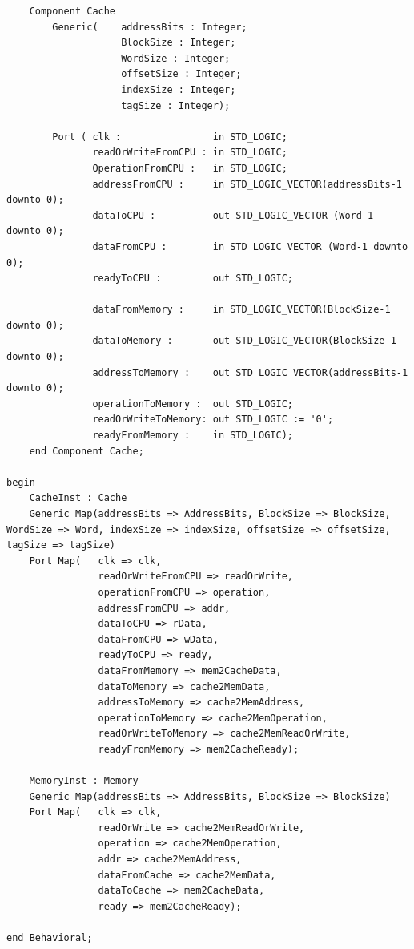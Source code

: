 \documentclass{article}
\begin{document}
\begin{lstlisting}
    Component Cache
        Generic(    addressBits : Integer;
                    BlockSize : Integer;
                    WordSize : Integer;
                    offsetSize : Integer;
                    indexSize : Integer;
                    tagSize : Integer);

        Port ( clk :                in STD_LOGIC;
               readOrWriteFromCPU : in STD_LOGIC;
               OperationFromCPU :   in STD_LOGIC;
               addressFromCPU :     in STD_LOGIC_VECTOR(addressBits-1 downto 0);
               dataToCPU :          out STD_LOGIC_VECTOR (Word-1 downto 0);
               dataFromCPU :        in STD_LOGIC_VECTOR (Word-1 downto 0);
               readyToCPU :         out STD_LOGIC;

               dataFromMemory :     in STD_LOGIC_VECTOR(BlockSize-1 downto 0);
               dataToMemory :       out STD_LOGIC_VECTOR(BlockSize-1 downto 0);
               addressToMemory :    out STD_LOGIC_VECTOR(addressBits-1 downto 0);
               operationToMemory :  out STD_LOGIC;
               readOrWriteToMemory: out STD_LOGIC := '0';
               readyFromMemory :    in STD_LOGIC);
    end Component Cache;

begin
    CacheInst : Cache
    Generic Map(addressBits => AddressBits, BlockSize => BlockSize, WordSize => Word, indexSize => indexSize, offsetSize => offsetSize, tagSize => tagSize)
    Port Map(   clk => clk,
                readOrWriteFromCPU => readOrWrite,
                operationFromCPU => operation,
                addressFromCPU => addr,
                dataToCPU => rData,
                dataFromCPU => wData,
                readyToCPU => ready,
                dataFromMemory => mem2CacheData,
                dataToMemory => cache2MemData,
                addressToMemory => cache2MemAddress,
                operationToMemory => cache2MemOperation,
                readOrWriteToMemory => cache2MemReadOrWrite,
                readyFromMemory => mem2CacheReady);

    MemoryInst : Memory
    Generic Map(addressBits => AddressBits, BlockSize => BlockSize)
    Port Map(   clk => clk,
                readOrWrite => cache2MemReadOrWrite,
                operation => cache2MemOperation,
                addr => cache2MemAddress,
                dataFromCache => cache2MemData,
                dataToCache => mem2CacheData,
                ready => mem2CacheReady);

end Behavioral;
\end{lstlisting}
\end{document}
